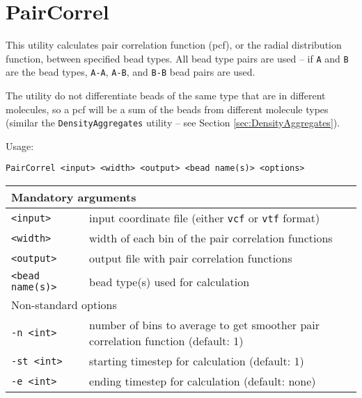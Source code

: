 \section{PairCorrel} \label{sec:PairCorrel}

This utility calculates pair correlation function (pcf), or the radial
distribution function, between specified bead types. All bead type pairs
are used -- if \texttt{A} and \texttt{B} are the bead types, \texttt{A-A},
\texttt{A-B}, and \texttt{B-B} bead pairs are used.

The utility do not differentiate beads of the same type that are in
different molecules, so a pcf will be a sum of the beads from different
molecule types (similar the \texttt{DensityAggregates} utility -- see
Section \ref{sec:DensityAggregates}).

Usage:

\vspace{1em}
\noindent
\texttt{PairCorrel <input> <width> <output> <bead name(s)> <options>}

\noindent
\begin{longtable}{p{}p{}}
  \toprule
  \multicolumn{2}{l}{Mandatory arguments} \\
  \midrule
  \texttt{<input>} & input coordinate file (either \texttt{vcf} or
    \texttt{vtf} format) \\
  \texttt{<width>} & width of each bin of the pair correlation functions \\
  \texttt{<output>} & output file with pair correlation functions \\
  \texttt{<bead name(s)>} & bead type(s) used for calculation \\
  \toprule
  \multicolumn{2}{l}{Non-standard options} \\
  \midrule
  \texttt{-n <int>} & number of bins to average to get smoother pair
    correlation function (default: 1) \\
  \texttt{-st <int>} & starting timestep for calculation (default: 1) \\
  \texttt{-e <int>} & ending timestep for calculation (default: none) \\
  \bottomrule
\end{longtable}

